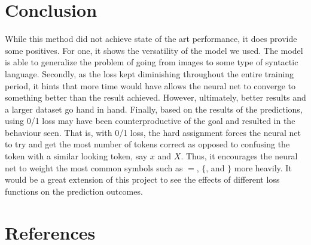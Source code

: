 \documentclass{article}
\begin{document}
\section*{Conclusion}

While this method did not achieve state of the art performance, it does provide
some positives. For one, it shows the versatility of the model we used. The model
is able to generalize the problem of going from images to some type of syntactic
language. Secondly, as the loss kept diminishing throughout the entire training
period, it hints that more time would have allows the neural net to converge to
something better than the result achieved. However, ultimately, better results
and a larger dataset go hand in hand. Finally, based on the results of the predictions,
using 0/1 loss may have been counterproductive of the goal and resulted in the behaviour
seen. That is, with 0/1 loss, the hard assignment forces the neural net to try
and get the most number of tokens correct as opposed to confusing the token with
a similar looking token, say $x$ and $X$. Thus, it encourages the neural net
to weight the most common symbols such as $=$, $\{$, and $\}$ more heavily. It would
be a great extension of this project to see the effects of different loss functions
on the prediction outcomes.

\section*{References}

\small


\begingroup\renewcommand{\section}[2]{}

\endgroup
\end{document}

